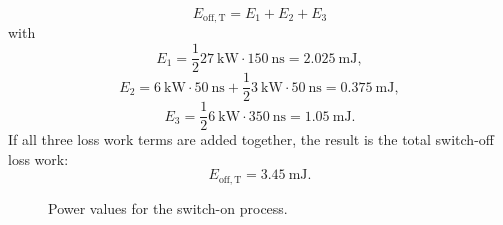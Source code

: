 \begin{solutionblock}
\begin{equation}
E_{\mathrm{off,T}} = E_{\mathrm{1}} + E_{\mathrm{2}} + E_{\mathrm{3}}
\end{equation}
with
\begin{equation}
E_{\mathrm{1}} = \frac{1}{2} \SI{27}{\kilo\watt} \cdot \SI{150}{\ns} = \SI {2.025}{\milli\joule},
\end{equation}
\begin{equation}
E_{\mathrm{2}} = \SI{6}{\kilo\watt} \cdot \SI{50}{\ns} + \frac{1}{2} \SI{3}{\kilo\watt} \cdot \SI{50}{\ns} = \SI {0.375}{\milli\joule},
\end{equation}
\begin{equation}
    E_{\mathrm{3}} = \frac{1}{2} \SI{6}{\kilo\watt} \cdot \SI{350}{\ns} = \SI {1.05}{\milli\joule}.
    \end{equation}
If all three loss work terms are added together, the result is the total switch-off loss work:
\begin{equation}
    E_{\mathrm{off,T}} =  \SI {3.45}{\milli\joule}.
\end{equation}
\begin{solutionfigure}[h]
    \centering
    \begin{subfigure}[t]{0.45\textwidth}
        \centering
        \caption{Power values for the switch-on process.}
        \label{fig:Power values for the switch-on process}
    \end{subfigure}
    \hfill %
    \begin{subfigure}[t]{0.45\textwidth}
        \centering
        \begin{tikzpicture}

\end{tikzpicture}
\end{subfigure}
\end{solutionfigure}
\end{solutionblock}
